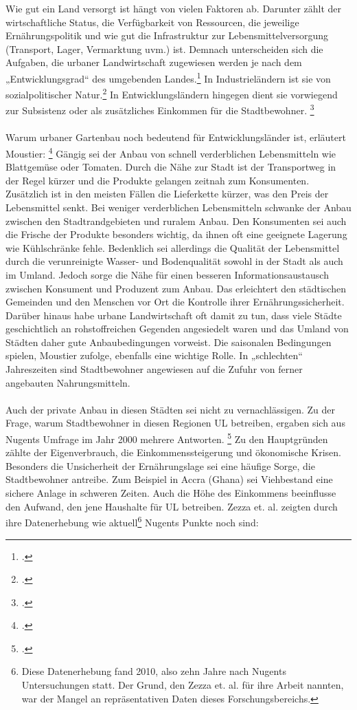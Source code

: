 \documentclass{scrartcl}
\begin{document}
Wie gut ein Land versorgt ist hängt von vielen Faktoren ab. Darunter zählt der wirtschaftliche Status, die Verfügbarkeit von Ressourcen, die jeweilige Ernährungspolitik und wie gut die Infrastruktur zur Lebensmittelversorgung (Transport, Lager, Vermarktung uvm.) ist. Demnach unterscheiden sich die Aufgaben, die urbaner Landwirtschaft zugewiesen werden je nach dem „Entwicklungsgrad“ des umgebenden Landes.\footcite{SmitUrbanToday} In Industrieländern ist sie von sozialpolitischer Natur.\footcites[vgl.][S. 21]{Berges2004UrbaneStadt}[S.26f]{SmitUrbanToday} In Entwicklungsländern hingegen dient sie vorwiegend zur Subsistenz oder als zusätzliches Einkommen für die Stadtbewohner. \footcites[vgl.][S.75]{Nugent2000TheEconomies}[S.26f]{SmitUrbanToday}\\
\\
Warum urbaner Gartenbau noch bedeutend für Entwicklungsländer ist, erläutert Moustier: \footcites[vgl.][S.6ff]{Moustier2007UrbanSupplier} Gängig sei der Anbau von schnell verderblichen Lebensmitteln wie Blattgemüse oder Tomaten. Durch die Nähe zur Stadt ist der Transportweg in der Regel kürzer und die Produkte gelangen zeitnah zum Konsumenten. Zusätzlich ist in den meisten Fällen die Lieferkette kürzer, was den Preis der Lebensmittel senkt. Bei weniger verderblichen Lebensmitteln schwanke der Anbau zwischen den Stadtrandgebieten und ruralem Anbau. Den Konsumenten sei auch die Frische der Produkte besonders wichtig, da ihnen oft eine geeignete Lagerung wie Kühlschränke fehle. Bedenklich sei allerdings die Qualität der Lebensmittel durch die verunreinigte Wasser- und Bodenqualität sowohl in der Stadt als auch im Umland. Jedoch sorge die Nähe für einen besseren Informationsaustausch zwischen Konsument und Produzent zum Anbau. Das erleichtert den städtischen Gemeinden und den Menschen vor Ort die Kontrolle ihrer Ernährungssicherheit. Darüber hinaus habe urbane Landwirtschaft oft damit zu tun, dass viele Städte geschichtlich an rohstoffreichen Gegenden angesiedelt waren und das Umland von Städten daher gute Anbaubedingungen vorweist. Die saisonalen Bedingungen spielen, Moustier zufolge, ebenfalls eine wichtige Rolle. In „schlechten“ Jahreszeiten sind Stadtbewohner angewiesen auf die Zufuhr von ferner angebauten Nahrungsmitteln. \\
\\
Auch der private Anbau in diesen Städten sei nicht zu vernachlässigen. Zu der Frage, warum Stadtbewohner in diesen Regionen UL betreiben, ergaben sich aus Nugents Umfrage im Jahr 2000 mehrere Antworten. \footcite[vgl.][S.74]{Nugent2000TheEconomies} Zu den Hauptgründen zählte der Eigenverbrauch, die Einkommenssteigerung und ökonomische Krisen. Besonders die Unsicherheit der Ernährungslage sei eine häufige Sorge, die Stadtbewohner antreibe. Zum Beispiel in Accra (Ghana) sei Viehbestand eine sichere Anlage in schweren Zeiten. Auch die Höhe des Einkommens beeinflusse den Aufwand, den jene Haushalte für UL betreiben. Zezza et. al. zeigten durch ihre Datenerhebung wie aktuell\footnote{Diese Datenerhebung fand 2010, also zehn Jahre nach Nugents Untersuchungen statt. Der Grund, den Zezza et. al. für ihre Arbeit nannten, war der Mangel an repräsentativen Daten dieses Forschungsbereichs.} Nugents Punkte noch sind:
\end{document}
